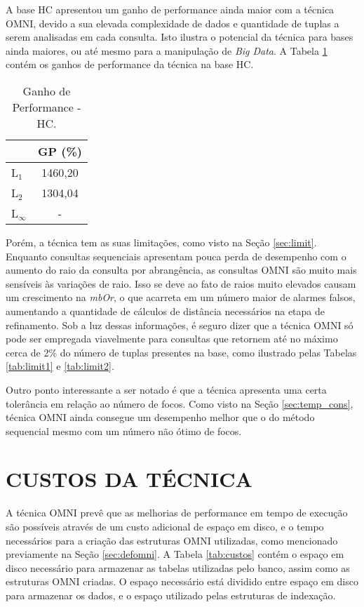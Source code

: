 A base HC apresentou um ganho de performance ainda maior com a técnica OMNI, devido a sua elevada complexidade de dados e quantidade de tuplas a serem analisadas em cada consulta. Isto ilustra o potencial da técnica para bases ainda maiores, ou até mesmo para a manipulação
de \textit{Big Data}. A Tabela \ref{tab:performance2} contém os ganhos de performance da técnica na base HC.

\begin{table}[H]
    \centering
    \caption[Ganho de Performance - HC]{Ganho de Performance - HC.
    \label{tab:performance2}}
   \begin{tabular}{l c}
        \toprule
            &GP (\%)\\
        \midrule
            L$_1$ & 1460,20 \\
            L$_2$ & 1304,04 \\
            L$_\infty$ & - \\
        \bottomrule
    \end{tabular}
\end{table}

Porém, a técnica tem as suas limitações, como visto na Seção \ref{sec:limit}. Enquanto consultas sequenciais apresentam pouca perda de desempenho com o aumento do raio da consulta por abrangência, as consultas OMNI são muito mais sensíveis às variações de raio.
Isso se deve ao fato de raios muito elevados causam um crescimento na \textit{mbOr}, o que acarreta em um número maior de alarmes falsos, aumentando a quantidade de cálculos de distância necessários na etapa de refinamento. Sob a luz dessas informações, é seguro dizer que 
a técnica OMNI só pode ser empregada viavelmente para consultas que retornem até no máximo cerca de 2\% do número de tuplas presentes na base, como ilustrado pelas Tabelas \ref{tab:limit1} e \ref{tab:limit2}.

Outro ponto interessante a ser notado é que a técnica apresenta uma certa tolerância em relação ao número de focos. Como visto na Seção \ref{sec:temp_cons}, técnica OMNI ainda consegue um desempenho melhor que o do método sequencial mesmo com um número não ótimo de focos.

\section{CUSTOS DA TÉCNICA}

A técnica OMNI prevê que as melhorias de performance em tempo de execução são possíveis através de um custo adicional de espaço em disco, e o tempo necessários
para a criação das estruturas OMNI utilizadas, como mencionado previamente na Seção \ref{sec:defomni}. A Tabela \ref{tab:custos} contém o espaço em disco
necessário para armazenar as tabelas utilizadas pelo banco, assim como as estruturas OMNI criadas. O espaço necessário está dividido
entre espaço em disco para armazenar os dados, e o espaço utilizado pelas estruturas de indexação.

